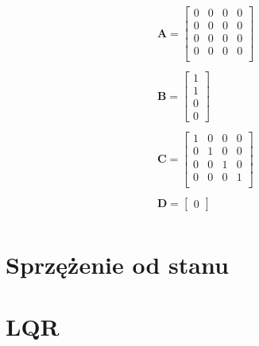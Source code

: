 \documentclass{article}
\begin{document}
\begin{equation}\label{eq:ss_val}
 \begin{array}{l}
  \mathbf{A} = \begin{bmatrix}  0 & 0 & 0 & 0 \\
  							   0 & 0 & 0 & 0 \\
  							   0 & 0 & 0 & 0 \\
  							   0 & 0 & 0 & 0 \\ 
  			   \end{bmatrix} \\ \\
  			   
  \mathbf{B} = \begin{bmatrix} 1 \\ 1 \\ 0 \\ 0 \end{bmatrix} \\ \\
  
  \mathbf{C} = \begin{bmatrix}  1 & 0 & 0 & 0 \\
  							   0 & 1 & 0 & 0 \\
  							   0 & 0 & 1 & 0 \\
  							   0 & 0 & 0 & 1 \\ 
  			   \end{bmatrix} \\ \\
  
  \mathbf{D} = \begin{bmatrix} 0 \end{bmatrix} \\
\end{array}
\end{equation}

\section{Sprzężenie od stanu}




\section{LQR}
\end{document}
